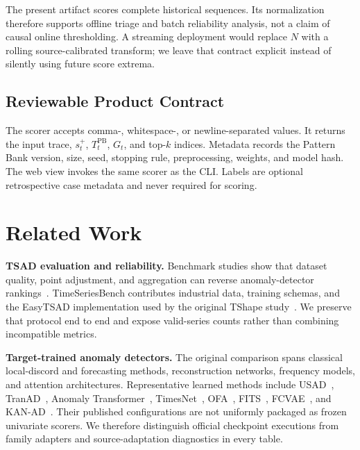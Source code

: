 \documentclass[conference]{IEEEtran}
\begin{document}
The present artifact scores complete historical sequences. Its normalization therefore supports offline triage and batch reliability analysis, not a claim of causal online thresholding. A streaming deployment would replace $N$ with a rolling source-calibrated transform; we leave that contract explicit instead of silently using future score extrema.

\subsection{Reviewable Product Contract}

The scorer accepts comma-, whitespace-, or newline-separated values. It returns the input trace, $s^+_t$, $T_t^{\mathrm{PB}}$, $G_t$, and top-$k$ indices. Metadata records the Pattern Bank version, size, seed, stopping rule, preprocessing, weights, and model hash. The web view invokes the same scorer as the CLI. Labels are optional retrospective case metadata and never required for scoring.

\section{Related Work}

\textbf{TSAD evaluation and reliability.}
Benchmark studies show that dataset quality, point adjustment, and aggregation can reverse anomaly-detector rankings~\cite{wu2021benchmarks,paparrizos2022volume,liu2024elephant}. TimeSeriesBench contributes industrial data, training schemas, and the EasyTSAD implementation used by the original TShape study~\cite{si2024timeseriesbench}. We preserve that protocol end to end and expose valid-series counts rather than combining incompatible metrics.

\textbf{Target-trained anomaly detectors.}
The original comparison spans classical local-discord and forecasting methods, reconstruction networks, frequency models, and attention architectures. Representative learned methods include USAD~\cite{audibert2020usad}, TranAD~\cite{tuli2022tranad}, Anomaly Transformer~\cite{xu2022anomaly}, TimesNet~\cite{wu2023timesnet}, OFA~\cite{zhou2023ofa}, FITS~\cite{zhou2024fits}, FCVAE~\cite{jiang2024fcvae}, and KAN-AD~\cite{li2025kanad}. Their published configurations are not uniformly packaged as frozen univariate scorers. We therefore distinguish official checkpoint executions from family adapters and source-adaptation diagnostics in every table.
\end{document}
